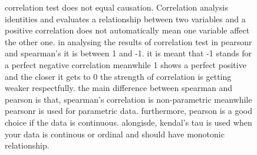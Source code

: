 \documentclass[letterpaper, 10 pt, conference]{ieeeconf}
\begin{document}
\begin{figure}[h!]
correlation test does not equal causation. Correlation analysis identities and evaluates a relationship between two variables and a positive correlation does not automatically mean one variable affect the other one. in analysing the results of correlation test in pearsonr and spearman's it is between 1 and -1. it is meant that -1 stands for a perfect negative correlation meanwhile 1 shows a perfect positive and the closer it gets to 0 the strength of correlation is getting weaker respectfully. the main difference between spearman and pearson is that, spearman's correlation is non-parametric meanwhile pearsonr is used for parametric data. furthermore, pearson is a good choice if the data is continuous. alongisde, kendal's tau is used when your data is continous or ordinal and should have monotonic relationship.
\end{figure}
\end{document}
